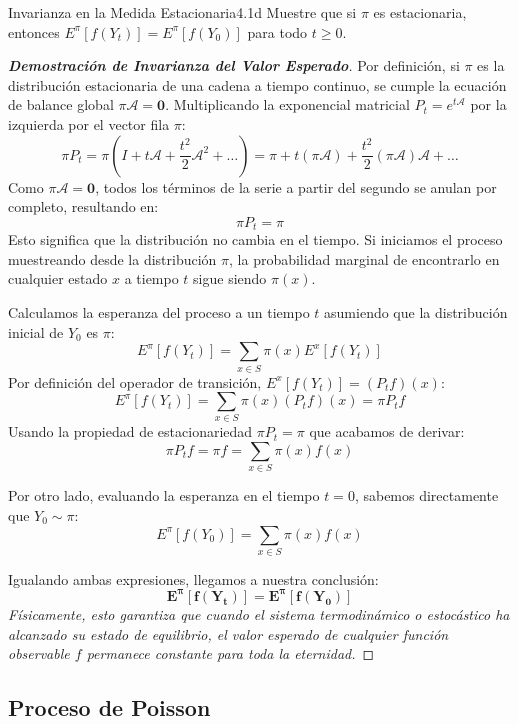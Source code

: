 \documentclass[10pt,a4paper]{article}
\begin{document}
\newpage

\begin{ejercicio}{Invarianza en la Medida Estacionaria}{4.1d}
    Muestre que si $\pi$ es estacionaria, entonces $E^\pi[f(Y_t)] = E^\pi[f(Y_0)]$ para todo $t \ge 0$.
\end{ejercicio}

\begin{proof}[\textbf{Demostración de Invarianza del Valor Esperado}]
    Por definición, si $\pi$ es la distribución estacionaria de una cadena a tiempo continuo, se cumple la ecuación de balance global $\pi \mathcal{A} = \mathbf{0}$.
    Multiplicando la exponencial matricial $P_t = e^{t\mathcal{A}}$ por la izquierda por el vector fila $\pi$:
    \[ \pi P_t = \pi \left( I + t\mathcal{A} + \frac{t^2}{2}\mathcal{A}^2 + \dots \right) = \pi + t(\pi\mathcal{A}) + \frac{t^2}{2}(\pi\mathcal{A})\mathcal{A} + \dots \]
    Como $\pi\mathcal{A} = \mathbf{0}$, todos los términos de la serie a partir del segundo se anulan por completo, resultando en:
    \[ \pi P_t = \pi \]
    Esto significa que la distribución no cambia en el tiempo. Si iniciamos el proceso muestreando desde la distribución $\pi$, la probabilidad marginal de encontrarlo en cualquier estado $x$ a tiempo $t$ sigue siendo $\pi(x)$.

    Calculamos la esperanza del proceso a un tiempo $t$ asumiendo que la distribución inicial de $Y_0$ es $\pi$:
    \[ E^\pi[f(Y_t)] = \sum_{x \in S} \pi(x) E^x[f(Y_t)] \]
    Por definición del operador de transición, $E^x[f(Y_t)] = (P_t f)(x)$:
    \[ E^\pi[f(Y_t)] = \sum_{x \in S} \pi(x) (P_t f)(x) = \pi P_t f \]
    Usando la propiedad de estacionariedad $\pi P_t = \pi$ que acabamos de derivar:
    \[ \pi P_t f = \pi f = \sum_{x \in S} \pi(x) f(x) \]
    
    Por otro lado, evaluando la esperanza en el tiempo $t=0$, sabemos directamente que $Y_0 \sim \pi$:
    \[ E^\pi[f(Y_0)] = \sum_{x \in S} \pi(x) f(x) \]
    
    Igualando ambas expresiones, llegamos a nuestra conclusión:
    \[ \mathbf{E^\pi[f(Y_t)] = E^\pi[f(Y_0)]} \]
    \textit{Físicamente, esto garantiza que cuando el sistema termodinámico o estocástico ha alcanzado su estado de equilibrio, el valor esperado de cualquier función observable $f$ permanece constante para toda la eternidad.}
\end{proof}

\newpage

\subsection{Proceso de Poisson}
\end{document}
